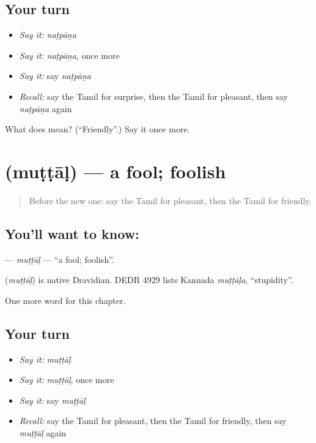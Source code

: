 \subsection*{Your turn}
\begin{itemize}
\raggedright
  \item \emph{Say it:} \emph{naṭpāṉa}
  \item \emph{Say it:} \emph{naṭpāṉa}, once more
  \item \emph{Say it:} say \emph{naṭpāṉa}
  \item \emph{Recall:} say the Tamil for surprise, then the Tamil for pleasant, then say \emph{naṭpāṉa} again
\end{itemize}

\begin{tcolorbox}[breakable,colback=teal!4,colframe=teal!35!black,title={Before you move on}]
What does  mean? (\textquotedblleft{}Friendly\textquotedblright{}.) Say it once more.
\end{tcolorbox}
\section[\texorpdfstring{\ta{முட்டாள்} (muṭṭāḷ)}{முட்டாள் (muṭṭāḷ)}]{ (muṭṭāḷ) — a fool; foolish}

\label{lesson:TA-C211-muttal}



\begin{quote}
Before the new one: say the Tamil for pleasant, then the Tamil for friendly.
\end{quote}

\subsection*{You'll want to know: }
\textbf{} — \emph{muṭṭāḷ} — \textquotedblleft{}a fool; foolish\textquotedblright{}.

\begin{cousinweb}
\textbf{} (\emph{muṭṭāḷ}) is native Dravidian. DEDR 4929 lists Kannada \emph{muṭṭāḷa}, \textquotedblleft{}stupidity\textquotedblright{}.
\end{cousinweb}

\begin{grammarlens}[title={What you've built}]
One more word for this chapter.
\end{grammarlens}

\subsection*{Your turn}
\begin{itemize}
\raggedright
  \item \emph{Say it:} \emph{muṭṭāḷ}
  \item \emph{Say it:} \emph{muṭṭāḷ}, once more
  \item \emph{Say it:} say \emph{muṭṭāḷ}
  \item \emph{Recall:} say the Tamil for pleasant, then the Tamil for friendly, then say \emph{muṭṭāḷ} again
\end{itemize}

